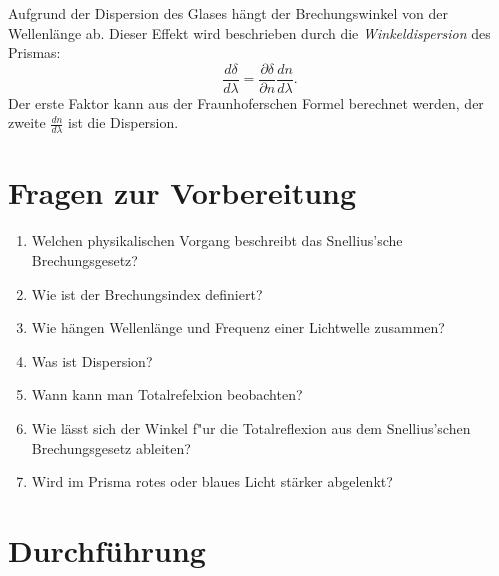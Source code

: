 \noindent
Aufgrund der Dispersion des Glases hängt der Brechungswinkel von der Wellenlänge ab. Dieser Effekt wird beschrieben durch die \textit{Winkeldispersion} des Prismas:
\begin{equation}
	\frac{d\delta}{d\lambda} = \frac{\partial\delta}{\partial n} \frac{dn}{d\lambda}.
\end{equation}
Der erste Faktor kann aus der Fraunhoferschen Formel berechnet werden, der zweite $\frac{dn}{d\lambda}$ ist die Dispersion.
\section{Fragen zur Vorbereitung}

\begin{enumerate}
 \item Welchen physikalischen Vorgang beschreibt das Snellius'sche Brechungsgesetz?
 \item Wie ist der Brechungsindex definiert?
 \item Wie hängen Wellenlänge und Frequenz einer Lichtwelle zusammen?
 \item Was ist Dispersion?
 \item Wann kann man Totalrefelxion beobachten?
 \item Wie lässt sich der Winkel f"ur die Totalreflexion aus dem Snellius'schen Brechungsgesetz ableiten?
 \item Wird im Prisma rotes oder blaues Licht stärker abgelenkt?
\end{enumerate}

\section{Durchführung} 

